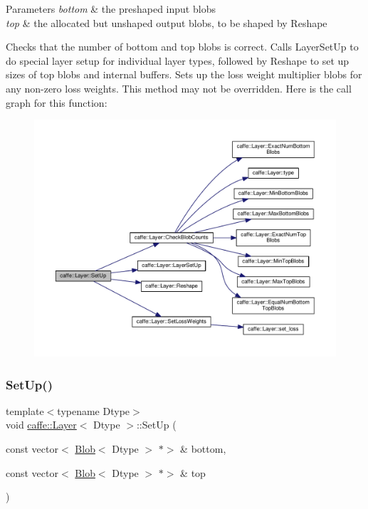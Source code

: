\begin{DoxyParams}{Parameters}
{\em bottom} & the preshaped input blobs \\
\hline
{\em top} & the allocated but unshaped output blobs, to be shaped by Reshape\\
\hline
\end{DoxyParams}
Checks that the number of bottom and top blobs is correct. Calls Layer\+Set\+Up to do special layer setup for individual layer types, followed by Reshape to set up sizes of top blobs and internal buffers. Sets up the loss weight multiplier blobs for any non-\/zero loss weights. This method may not be overridden. Here is the call graph for this function\+:
\nopagebreak
\begin{figure}[H]
\begin{center}
\leavevmode
\includegraphics[width=350pt]{classcaffe_1_1_layer_a18d6bfdb535ab8e96a971dec4ae39a84_cgraph}
\end{center}
\end{figure}
\mbox{\label{classcaffe_1_1_layer_a18d6bfdb535ab8e96a971dec4ae39a84}} 
\subsubsection{\texorpdfstring{Set\+Up()}{SetUp()}\hspace{0.1cm}{\footnotesize\ttfamily [2/2]}}
{\footnotesize\ttfamily template$<$typename Dtype$>$ \\
void \mbox{\hyperlink{classcaffe_1_1_layer}{caffe\+::\+Layer}}$<$ Dtype $>$\+::Set\+Up (\begin{DoxyParamCaption}\item[{const vector$<$ \mbox{\hyperlink{classcaffe_1_1_blob}{Blob}}$<$ Dtype $>$ $\ast$$>$ \&}]{bottom,  }\item[{const vector$<$ \mbox{\hyperlink{classcaffe_1_1_blob}{Blob}}$<$ Dtype $>$ $\ast$$>$ \&}]{top }\end{DoxyParamCaption})\hspace{0.3cm}{\ttfamily [inline]}}



